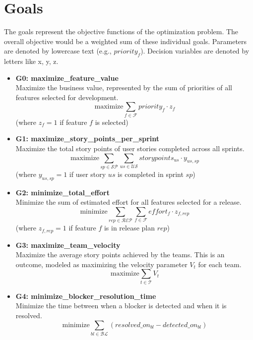 \documentclass[11pt]{article}
\begin{document}
\section{Goals}
The goals represent the objective functions of the optimization problem. The overall objective would be a weighted sum of these individual goals. Parameters are denoted by lowercase text (e.g., $priority_f$). Decision variables are denoted by letters like x, y, z.

\begin{itemize}
    \item \textbf{G0: maximize\_feature\_value} \\
    Maximize the business value, represented by the sum of priorities of all features selected for development.
    $$ \text{maximize} \sum_{f \in \mathcal{F}} priority_f \cdot z_{f} $$
    (where $z_f=1$ if feature $f$ is selected)

    \item \textbf{G1: maximize\_story\_points\_per\_sprint} \\
    Maximize the total story points of user stories completed across all sprints.
    $$ \text{maximize} \sum_{sp \in \mathcal{SP}} \sum_{us \in \mathcal{US}} storypoints_{us} \cdot y_{us, sp} $$
    (where $y_{us, sp}=1$ if user story $us$ is completed in sprint $sp$)
    
    \item \textbf{G2: minimize\_total\_effort} \\
    Minimize the sum of estimated effort for all features selected for a release.
    $$ \text{minimize} \sum_{rep \in \mathcal{REP}} \sum_{f \in \mathcal{F}} effort_f \cdot z_{f, rep} $$
    (where $z_{f, rep}=1$ if feature $f$ is in release plan $rep$)
    
    \item \textbf{G3: maximize\_team\_velocity} \\
    Maximize the average story points achieved by the teams. This is an outcome, modeled as maximizing the velocity parameter $V_t$ for each team.
    $$ \text{maximize} \sum_{t \in \mathcal{T}} V_t $$
    
    \item \textbf{G4: minimize\_blocker\_resolution\_time} \\
    Minimize the time between when a blocker is detected and when it is resolved.
    $$ \text{minimize} \sum_{bl \in \mathcal{BL}} (resolved\_on_{bl} - detected\_on_{bl}) $$
    

\end{itemize}
\end{document}
